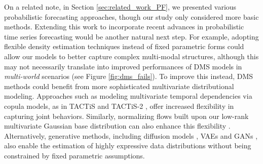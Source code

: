 \documentclass[a4paper,oneside,bibliography=totoc]{scrbook}
\begin{document}
%
On a related note, in Section \ref{sec:related_work_PF}, we presented various probabilistic forecasting approaches, though our study only considered more basic methods. Extending this work to incorporate recent advances in probabilistic time series forecasting would be another natural next step. 
For example, adopting flexible density estimation techniques \cite{drouin_tactis_2022, bergsma_c2far_2022, ashok_tactis-2_2023, bergsma_sutranets_2023} instead of fixed parametric forms could allow our models to better capture complex multi-modal structures, although this may not necessarily translate into improved performances of DMS models in \textit{multi-world} scenarios (see Figure \ref{fig:dms_fails}).
To improve this instead, DMS methods could benefit from more sophisticated multivariate distributional modeling. Approaches such as modeling multivariate temporal dependencies via copula models, as in TACTiS and TACTiS-2 \cite{drouin_tactis_2022, ashok_tactis-2_2023}, offer increased flexibility in capturing joint behaviors. 
Similarly, normalizing flows built upon our low-rank multivariate Gaussian base distribution can also enhance this flexibility \cite{feng_multi-scale_2024, rasul_multivariate_2020, drouin_tactis_2022, ashok_tactis-2_2023}.
Alternatively, generative methods, including diffusion models \cite{rasul_autoregressive_2021, shen_non-autoregressive_2023, shen_multi-resolution_2023, li_transformer-modulated_2023}, VAEs \cite{li_generative_2022, feng_latent_2024, tong_probabilistic_2022} and GANs \cite{wu_adversarial_2020, koochali_if_2021}, also enable the estimation of highly expressive data distributions without being constrained by fixed parametric assumptions. 
\end{document}
